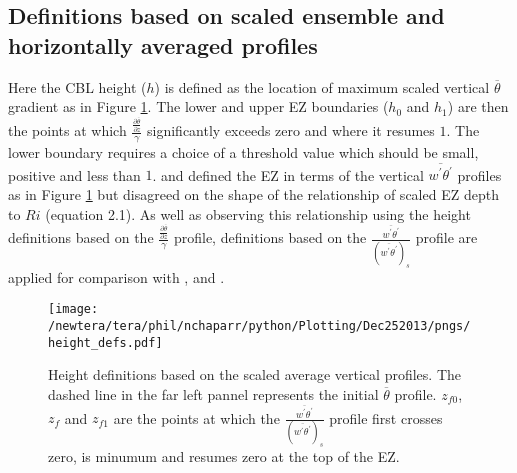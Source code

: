 \subsection{Definitions based on scaled ensemble and horizontally averaged profiles}

Here the CBL height ($h$) is defined as the location of maximum scaled vertical $\overline{\theta}$ gradient as in Figure \ref{fig:hdefs}.  The lower and upper EZ boundaries ($h_{0}$ and $h_{1}$) are then the points at which $\frac{\frac{\partial \overline{\theta}}{\partial z}}{\gamma}$ significantly exceeds zero and where it resumes $1$.  The lower boundary requires a choice of a threshold value which should be small, positive and less than $1$. \cite{FedConzMir04} and \cite{BrooksFowler2} defined the EZ in terms of the vertical $\overline{w^{'}\theta^{'}}$ profiles as in Figure \ref{fig:hdefs} but disagreed on the shape of the relationship of scaled EZ depth to $Ri$ (equation 2.1).  As well as observing this relationship using the height definitions based on the $\frac{\frac{\partial \overline{\theta}}{\partial z}}{\gamma}$ profile, definitions based on the $\frac{\overline{w^{'}\theta^{'}}}{(\overline{w^{'}\theta^{'}})_{s}}$ profile are applied for comparison with \cite{BrooksFowler2}, \cite{FedConzMir04} and \cite{GarciaMellado}.\\  

\begin{figure}[htbp]
    \centering
    \texttt{[image: /newtera/tera/phil/nchaparr/python/Plotting/Dec252013/pngs/height\_defs.pdf]}
    \caption[Height Definitions]{Height definitions based on the scaled average vertical profiles. The dashed line in the far left pannel represents the initial $\overline{\theta}$ profile. $z_{f0}$, $z_{f}$ and $z_{f1}$ are the points at which the $\frac{\overline{w^{'}\theta^{'}}}{(\overline{w^{'}\theta^{'}})_{s}}$ profile first crosses zero, is minumum and resumes zero at the top of the EZ.}
    \label{fig:hdefs}   %
\end{figure}

